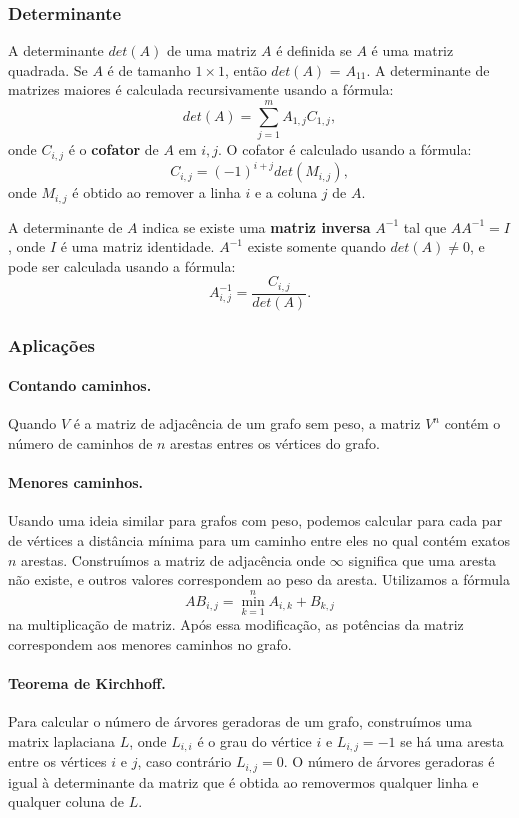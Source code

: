\subsubsection{Determinante} 
A determinante $det(A)$ de uma matriz $A$ é definida se $A$ é uma matriz quadrada. Se $A$ é de tamanho $1\times 1$, então $det(A)$ = $A_{11}$. A determinante de matrizes maiores é calculada recursivamente usando a fórmula:
$$det(A) = \sum_{j=1}^{m}A_{1,j}C_{1,j},$$
onde $C_{i,j}$ é o \textbf{cofator} de $A$ em $i,j$. O cofator é calculado usando a fórmula:
$$C_{i,j} = (-1)^{i+j}det(M_{i,j}),$$
onde $M_{i,j}$ é obtido ao remover a linha $i$ e a coluna $j$ de $A$.

A determinante de $A$ indica se existe uma \textbf{matriz inversa} $A^{-1}$ tal que $AA^{-1} = I$, onde $I$ é uma matriz identidade. $A^{-1}$ existe somente quando $det(A) \neq 0$, e pode ser calculada usando a fórmula:
$$A^{-1}_{i,j} = \frac{C_{i,j}}{det(A)}.$$

\subsubsection{Aplicações}
\paragraph{Contando caminhos.} Quando $V$ é a matriz de adjacência de um grafo sem peso, a matriz $V^n$ contém o número de caminhos de $n$ arestas entres os vértices do grafo.

\paragraph{Menores caminhos.} Usando uma ideia similar para grafos com peso, podemos calcular para cada par de vértices a distância mínima para um caminho entre eles no qual contém exatos $n$ arestas. Construímos a matriz de adjacência onde $\infty$ significa que uma aresta não existe, e outros valores correspondem ao peso da aresta. Utilizamos a fórmula
$$AB_{i,j} = \min_{k=1}^{n} A_{i,k}+B_{k,j}$$
na multiplicação de matriz. Após essa modificação, as potências da matriz correspondem aos menores caminhos no grafo.

\paragraph{Teorema de Kirchhoff.} Para calcular o número de árvores geradoras de um grafo, construímos uma matrix laplaciana $L$, onde $L_{i,i}$ é o grau do vértice $i$ e $L_{i,j} = -1$ se há uma aresta entre os vértices $i$ e $j$, caso contrário $L_{i,j} = 0$. O número de árvores geradoras é igual à determinante da matriz que é obtida ao removermos qualquer linha e qualquer coluna de $L$.